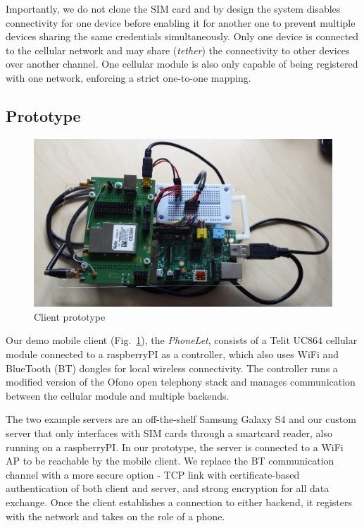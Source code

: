 \documentclass{sig-alternate-2013}
\begin{document}
Importantly, we do not clone the SIM card and by design the system disables connectivity for one device before enabling it for another one to prevent multiple devices sharing the same credentials simultaneously. Only one device is connected to the cellular network and may share (\emph{tether}) the connectivity to other devices over another channel. One cellular module is also only capable of being registered with one network, enforcing a strict one-to-one mapping.

\subsection{Prototype}

\begin{figure}[t!]
\centering
\includegraphics[width=0.95\columnwidth]{figs/client}
\caption{Client prototype}
\label{fig:client}
\end{figure}

Our demo mobile client (Fig.~\ref{fig:client}), the \emph{PhoneLet}, consists of a Telit UC864 cellular module connected to a raspberryPI as a controller, which also uses WiFi and BlueTooth (BT) dongles for local wireless connectivity. The controller runs a modified version of the Ofono open telephony stack and manages communication between the cellular module and multiple backends.

The two example servers are an off-the-shelf Samsung Galaxy S4 and our custom server that only interfaces with SIM cards through a smartcard reader, also running on a raspberryPI. In our prototype, the server is connected to a WiFi AP to be reachable by the mobile client. We replace the BT communication channel with a more secure option - TCP link with certificate-based authentication of both client and server, and strong encryption for all data exchange. Once the client establishes a connection to either backend, it registers with the network and takes on the role of a phone.
\end{document}
